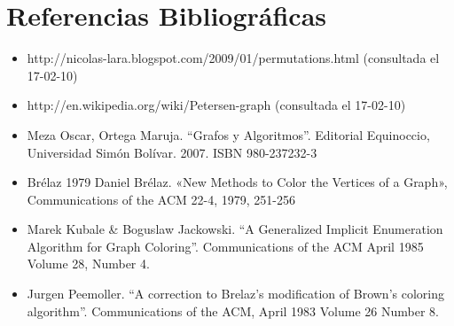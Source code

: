 \documentclass[a4paper,10pt]{article}
\begin{document}
\section{Referencias Bibliográficas}
\begin{itemize}
 \item http://nicolas-lara.blogspot.com/2009/01/permutations.html (consultada el 17-02-10)
 \item http://en.wikipedia.org/wiki/Petersen-graph (consultada el 17-02-10)
 \item Meza Oscar, Ortega Maruja. “Grafos y Algoritmos”. Editorial Equinoccio, Universidad Simón Bolívar. 2007. ISBN 980-237232-3
 \item Brélaz 1979 Daniel Brélaz. «New Methods to Color the Vertices of a Graph», Communications of the ACM 22-4, 1979, 251-256
 \item Marek Kubale & Boguslaw Jackowski. ``A Generalized Implicit Enumeration Algorithm for Graph Coloring''. Communications of the ACM April 1985 Volume 28, Number 4.
 \item Jurgen Peemoller. ``A correction to Brelaz's modification of Brown's coloring algorithm''. Communications of the ACM, April 1983 Volume 26 
	Number 8.
\end{itemize}
\end{document}
